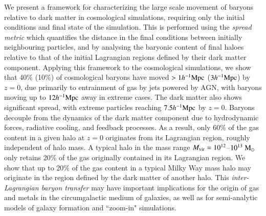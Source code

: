 We present a framework for characterizing the large scale movement of baryons
relative to dark matter in cosmological simulations, requiring only the
initial conditions and final state of the simulation. This is performed using
the {\it spread metric} which quantifies the distance in the final conditions
between initially neighbouring particles, and by analysing the baryonic
content of final haloes relative to that of the initial Lagrangian regions
defined by their dark matter component. Applying this framework to the
\simba{} cosmological simulations, we show that 40\% (10\%) of cosmological
baryons have moved $> 1h^{-1}{\rm Mpc}{}$ ($3h^{-1}{\rm Mpc}{}$) by $z=0$, due primarily to
entrainment of gas by jets powered by AGN, with baryons moving up to
$12h^{-1}{\rm Mpc}{}$ away in extreme cases. The dark matter also shows significant
spread, with extreme particles reaching $7.5h^{-1}{\rm Mpc}{}$ by $z=0$. Baryons
decouple from the dynamics of the dark matter component due to hydrodynamic
forces, radiative cooling, and feedback processes. As a result, only 60\% of
the gas content in a given halo at $z=0$ originates from its Lagrangian
region, roughly independent of halo mass. A typical halo in the mass range
$M_{\rm vir} = 10^{12}$--$10^{13}\;{\rm M}_{\odot}$ only retains 20\% of the gas
originally contained in its Lagrangian region. We show that up to 20\% of the
gas content in a typical Milky Way mass halo may originate in the region
defined by the dark matter of another halo. This {\it inter-Lagrangian baryon
transfer} may have important implications for the origin of gas and metals in
the circumgalactic medium of galaxies, as well as for semi-analytic models of
galaxy formation and “zoom-in" simulations.